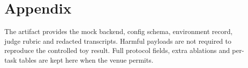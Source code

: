 \section{Appendix}
The artifact provides the mock backend, config schema, environment record, judge rubric and redacted transcripts.
Harmful payloads are not required to reproduce the controlled toy result. Full protocol fields, extra ablations and
per-task tables are kept here when the venue permits.

